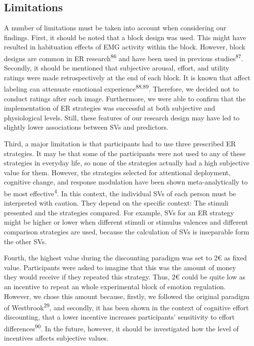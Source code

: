 \documentclass[
  man,floatsintext]{apa6}
\begin{document}
\hypertarget{limitations}{%
\subsection{Limitations}\label{limitations}}

A number of limitations must be taken into account when considering our findings.
First, it should be noted that a block design was used.
This might have resulted in habituation effects of EMG activity within the block.
However, block designs are common in ER research\textsuperscript{86} and have been used in previous studies\textsuperscript{87}.
Secondly, it should be mentioned that subjective arousal, effort, and utility ratings were made retrospectively at the end of each block.
It is known that affect labeling can attenuate emotional experience\textsuperscript{88,89}.
Therefore, we decided not to conduct ratings after each image.
Furthermore, we were able to confirm that the implementation of ER strategies was successful at both subjective and physiological levels.
Still, these features of our research design may have led to slightly lower associations between SVs and predictors.

Third, a major limitation is that participants had to use three prescribed ER strategies.
It may be that some of the participants were not used to any of these strategies in everyday life, so none of the strategies actually had a high subjective value for them.
However, the strategies selected for attentional deployment, cognitive change, and response modulation have been shown meta-analytically to be most effective\textsuperscript{4}.
In this context, the individual SVs of each person must be interpreted with caution.
They depend on the specific context: The stimuli presented and the strategies compared.
For example, SVs for an ER strategy might be higher or lower when different stimuli or stimulus valences and different comparison strategies are used, because the calculation of SVs is inseparable form the other SVs.

Fourth, the highest value during the discounting paradigm was set to 2€ as fixed value.
Participants were asked to imagine that this was the amount of money they would receive if they repeated this strategy.
Thus, 2€ could be quite low as an incentive to repeat an whole experimental block of emotion regulation.
However, we chose this amount because, firstly, we followed the original paradigm of Westbrook\textsuperscript{29}, and secondly, it has been shown in the context of cognitive effort discounting, that a lower incentive increases participants' sensitivity to effort differences\textsuperscript{90}.
In the future, however, it should be investigated how the level of incentives affects subjective values.
\end{document}

